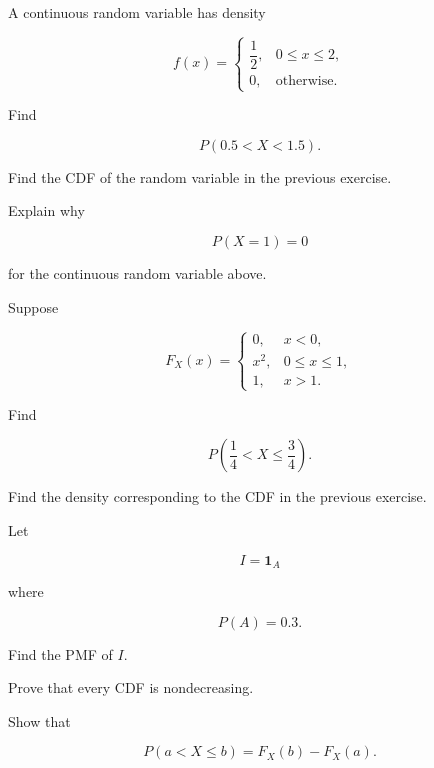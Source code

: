 \begin{exercise}[2]
A continuous random variable has density

\[
f(x)
=
\begin{cases}
\dfrac12,&0\leq x\leq2,\\
0,&\text{otherwise}.
\end{cases}
\]

Find

\[
P(0.5<X<1.5).
\]
\end{exercise}

\begin{exercise}[2]
Find the CDF of the random variable in the previous exercise.
\end{exercise}

\begin{exercise}[2]
Explain why

\[
P(X=1)=0
\]

for the continuous random variable above.
\end{exercise}

\begin{exercise}[2]
Suppose

\[
F_X(x)
=
\begin{cases}
0,&x<0,\\
x^2,&0\leq x\leq1,\\
1,&x>1.
\end{cases}
\]

Find

\[
P\left(
\frac14<X\leq\frac34
\right).
\]
\end{exercise}

\begin{exercise}[2]
Find the density corresponding to the CDF in the previous exercise.
\end{exercise}

\begin{exercise}[2]
Let

\[
I=\mathbf{1}_A
\]

where

\[
P(A)=0.3.
\]

Find the PMF of \(I\).
\end{exercise}

\begin{exercise}[3]
Prove that every CDF is nondecreasing.
\end{exercise}

\begin{exercise}[3]
Show that

\[
P(a<X\leq b)
=
F_X(b)-F_X(a).
\]
\end{exercise}

